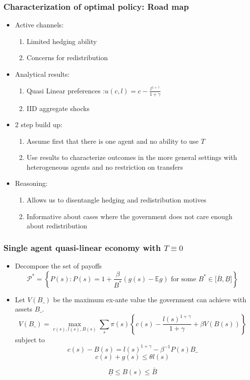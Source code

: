 \documentclass{beamer}
\begin{document}
\begin{frame}
\frametitle{Characterization of optimal policy: Road map}
\begin{itemize}
\item Active channels:
\begin{enumerate}
\item Limited hedging ability
\item Concerns for redistribution
\end{enumerate}
\item Analytical results:
\begin{enumerate}
\item Quasi Linear preferences :$u(c,l)=c-\frac{l^{1+\gamma }}{1+\gamma }$
\item IID aggregate shocks
\end{enumerate}
\item 2 step build up:
\begin{enumerate}
\item Assume first that there is one agent and no ability to use $T$
\item Use results to characterize outcomes in the more general settings with heterogeneous agents and no restriction on transfers
\end{enumerate}
\item Reasoning:
\begin{enumerate}
\item Allows us to disentangle hedging and redistribution motives
\item Informative about cases where the government does not care enough about redistribution
\end{enumerate}
\end{itemize}
\end{frame}

\begin{frame}%

\frametitle{Single agent quasi-linear economy with $T\equiv 0$}
\begin{itemize}
\item Decompose the set of payoffs 
\[\mathcal{P}^{\ast }=\left\{ P(s):P(s)=1+\frac{\beta }{B^{\ast }}(g(s)-%
\mathbb{E}g)\text{ for some }B^{\ast }\in \lbrack \overline{B},\underline{B}%
]\right\} \]

\item  Let $V(B\_)$ be the maximum ex-ante value the government can achieve with assets $B\_$. 
\[V(B\_)=\max_{c(s),l(s),B(s)} \sum_{s}\pi(s)\left\{c(s)-\frac{l(s)^{1+\gamma}}{1+\gamma}+\beta V(B(s)) \right\}\]
subject to
\[   c(s)-B(s)=l(s)^{1+\gamma}-\beta^{-1} P(s)B\_\]
\[c(s)+g(s)\leq\theta l(s)\]

\[\underline{B}\leq B(s)\leq \bar{B}\]

\end{itemize}

\end{frame}
\end{document}
